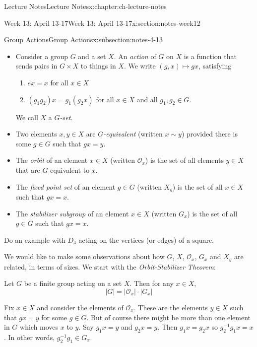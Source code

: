 \documentclass[oneside,11pt,]{book}
\begin{document}
\begin{chapterptx}{Lecture Notes}{}{Lecture Notes}{}{}{x:chapter:ch-lecture-notes}
\begin{sectionptx}{Week 13: April 13-17}{}{Week 13: April 13-17}{}{}{x:section:notes-week12}
\begin{subsectionptx}{Group Actions}{}{Group Actions}{}{}{x:subsection:notes-4-13}
%
\begin{itemize}[label=\textbullet]
\item{}Consider a group \(G\) and a set \(X\). An \emph{action} of \(G\) on \(X\) is a function that sends pairs in \(G \times X\) to things in \(X\). We write \((g,x) \mapsto gx\), satisfying%
\par
%
\begin{enumerate}
\item{}\(ex = x\) for all \(x \in X\)%
\item{}\((g_1g_2)x = g_1(g_2x)\) for all \(x \in X\) and all \(g_1, g_2\in G\).%
\end{enumerate}
%
\par
We call \(X\) a \emph{\(G\)-set}.%
\item{}Two elements \(x, y \in X\) are \emph{\(G\)-equivalent} (written \(x \sim y\)) provided there is some \(g \in G\) such that \(gx = y\).%
\item{}The \emph{orbit} of an element \(x \in X\) (written \(\mathcal{O}_x\)) is the set of all elements \(y \in X\) that are \(G\)-equivalent to \(x\).%
\item{}The \emph{fixed point set} of an element \(g \in G\) (written \(X_g\)) is the set of all \(x \in X\) such that \(gx = x\).%
\item{}The \emph{stabilizer subgroup} of an element \(x \in X\) (written \(G_x\)) is the set of all \(g \in G\) such that \(gx = x\).%
\end{itemize}
%
\par
Do an example with \(D_4\) acting on the vertices (or edges) of a square.%
\par
We would like to make some observations about how \(G\), \(X\), \(\mathcal{O}_x\), \(G_x\) and \(X_g\) are related, in terms of sizes. We start with the \emph{Orbit-Stabilizer Theorem}:%
\par
Let \(G\) be a finite group acting on a set \(X\). Then for any \(x \in X\),%
\begin{equation*}
|G| = |\mathcal{O}_x|\cdot |G_x|
\end{equation*}
%
\par
Fix \(x \in X\) and consider the elements of \(\mathcal{O}_x\). These are the elements \(y \in X\) such that \(gx = y\) for some \(g \in G\). But of course there might be more than one element in \(G\) which moves \(x\) to \(y\). Say \(g_1x = y\) and \(g_2x = y\). Then \(g_1x = g_2x\) so \(g_2^{-1}g_1 x = x\). In other words, \(g_2^{-1}g_1 \in G_x\).%
\par

\end{subsectionptx}
\end{sectionptx}
\end{chapterptx}
\end{document}
